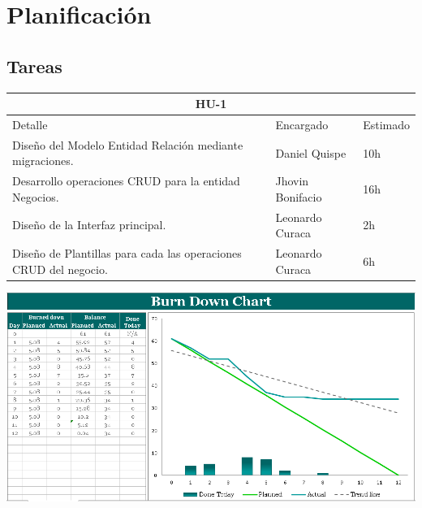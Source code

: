 \chapter{Planificación}
\section{Tareas}
\begin{table}[htbp]
	\begin{center}
		\begin{tabular}{|p{10cm} | p{3.2cm} | p{1.8cm}|}
			\hline
			\multicolumn{3}{|c|}{HU-1}\\
			\hline
			Detalle & Encargado & Estimado \\
			\hline
			Diseño del Modelo Entidad Relación mediante migraciones. & Daniel Quispe & 10h \\
			\hline
			Desarrollo operaciones CRUD para la entidad Negocios. & Jhovin Bonifacio & 16h \\
			\hline
			Diseño de la Interfaz principal. & Leonardo Curaca & 2h \\
			\hline
			Diseño de Plantillas para cada las operaciones CRUD del negocio. & Leonardo Curaca & 6h \\
			\hline	
		\end{tabular}
	\end{center}
\end{table}

\centering
	\includegraphics[width=1.20\textwidth]{img/BurnDownChart}\par\vspace{1cm}
	\vspace{0.30cm}	



